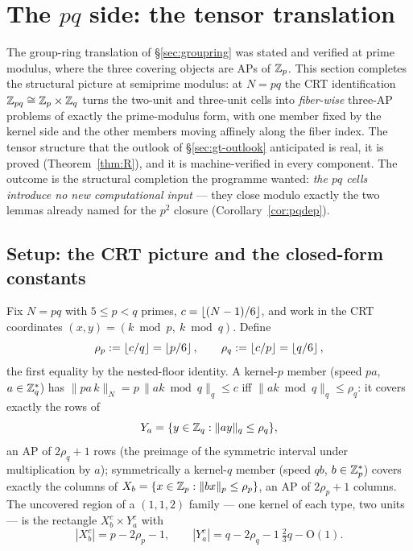 
\section{The $pq$ side: the tensor translation}\label{sec:pq}

The group-ring translation of \S\ref{sec:groupring} was stated and verified at
prime modulus, where the three covering objects are APs of $\mathbb{Z}_p$. This
section completes the structural picture at semiprime modulus: at $N=pq$ the
CRT identification $\mathbb{Z}_{pq}\cong\mathbb{Z}_p\times\mathbb{Z}_q$ turns the two-unit and
three-unit cells into \emph{fiber-wise} three-AP problems of exactly the
prime-modulus form, with one member fixed by the kernel side and the other
members moving affinely along the fiber index. The tensor structure that the
outlook of \S\ref{sec:gt-outlook} anticipated is real, it is proved
(Theorem~\ref{thm:R}), and it is machine-verified in every component. The
outcome is the structural completion the programme wanted: \emph{the $pq$
cells introduce no new computational input} --- they close modulo exactly the
two lemmas already named for the $p^2$ closure (Corollary~\ref{cor:pqdep}).

\subsection{Setup: the CRT picture and the closed-form constants}
\label{sec:pq-setup}

Fix $N=pq$ with $5\le p<q$ primes, $c=\left\lfloor (N-1)/6 \right\rfloor$, and work in the CRT
coordinates $(x,y)=(k\bmod p,\ k\bmod q)$. Define
\[
\rho_p:=\left\lfloor c/q \right\rfloor=\left\lfloor p/6 \right\rfloor,\qquad \rho_q:=\left\lfloor c/p \right\rfloor=\left\lfloor q/6 \right\rfloor,
\]
the first equality by the nested-floor identity. A kernel-$p$ member (speed
$pa$, $a\in\mathbb{Z}_q^{*}$) has $\|pa\,k\|_{N}=p\,\|ak\bmod q\|_q\le c$ iff
$\|ak\bmod q\|_q\le\rho_q$: it covers exactly the rows of
\[
Y_a=\{y\in\mathbb{Z}_q:\|ay\|_q\le\rho_q\},
\]
an AP of $2\rho_q+1$ rows (the preimage of the symmetric interval under
multiplication by $a$); symmetrically a kernel-$q$ member (speed $qb$,
$b\in\mathbb{Z}_p^{*}$) covers exactly the columns of
$X_b=\{x\in\mathbb{Z}_p:\|bx\|_p\le\rho_p\}$, an AP of $2\rho_p+1$ columns. The
uncovered region of a $(1,1,2)$ family --- one kernel of each type, two units
--- is the rectangle $X_b^{c}\times Y_a^{c}$ with
\[
|X_b^{c}|=p-2\rho_p-1,\qquad |Y_a^{c}|=q-2\rho_q-1\ \tfrac{2}{3}q-\mathrm{O}(1).
\]

